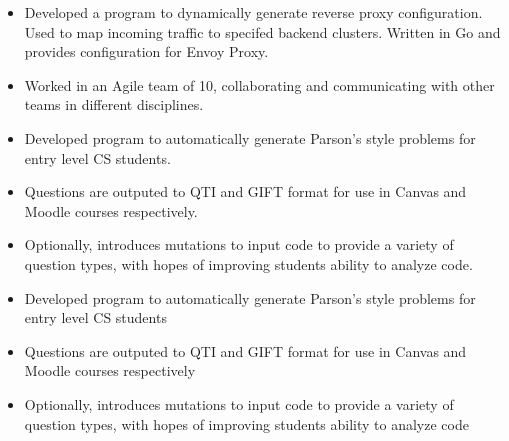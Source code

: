 

\begin{itemize}
    \item Developed a program to dynamically generate reverse proxy configuration.  Used to map incoming traffic to specifed 
      backend clusters.  Written in Go and provides configuration for Envoy Proxy.
    \item Worked in an Agile team of 10, collaborating and communicating with other teams in different disciplines.
\end{itemize}


\divider


\begin{itemize}
    \item Developed program to automatically generate Parson's style problems for entry level CS students.
    \item Questions are outputed to QTI and GIFT format for use in Canvas and Moodle courses respectively.
    \item Optionally, introduces mutations to input code to provide a variety of question types, with hopes of improving students 
      ability to analyze code.
\end{itemize}


\divider


\begin{itemize}
    \item Developed program to automatically generate Parson's style problems for entry level CS students
    \item Questions are outputed to QTI and GIFT format for use in Canvas and Moodle courses respectively
    \item Optionally, introduces mutations to input code to provide a variety of question types, with hopes of improving students 
      ability to analyze code
\end{itemize}



